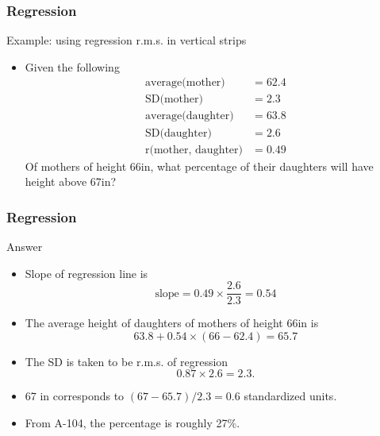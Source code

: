 \documentclass[handout]{beamer}
\begin{document}

   \begin{frame} \frametitle{Regression}

   \begin{block}
   {Example: using regression r.m.s. in vertical strips}
   \begin{itemize}
   \item Given the following
     $$
     \begin{aligned}
       \text{average(mother)} &= 62.4\\
       \text{SD(mother)} &= 2.3 \\
       \text{average(daughter)} &= 63.8 \\
       \text{SD(daughter)} &= 2.6 \\
       \text{r(mother, daughter)} &= 0.49
     \end{aligned}
     $$
   Of mothers of height 66in, what percentage
   of their daughters will have height above 67in?

   \end{itemize}
   \end{block}
   \end{frame}


   \begin{frame} \frametitle{Regression}

   \begin{block}
   {Answer}
   \begin{itemize}
   \item Slope of regression line is
   $$
   \text{slope} = 0.49 \times \frac{2.6}{2.3} = 0.54
   $$
   \item The average height of daughters of
   mothers of height 66in is
   $$
   63.8 + 0.54 \times (66 - 62.4) = 65.7
   $$

   \item The SD is taken to be r.m.s. of regression
   $$
   0.87 \times 2.6 = 2.3.
   $$


     \item 67 in corresponds to $(67-65.7)/2.3=0.6$ standardized units.

     \item From A-104, the percentage is roughly 27\%.

   \end{itemize}
   \end{block}
   \end{frame}
\end{document}
